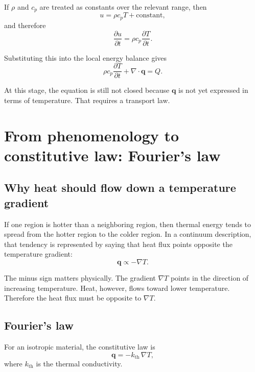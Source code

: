 \documentclass[11pt]{article}
\newcommand{\qvec}{\mathbf{q}}
\newcommand{\kth}{k_{\mathrm{th}}}
\begin{document}
If $\rho$ and $c_p$ are treated as constants over the relevant range, then
\begin{equation}
u = \rho c_p T + \text{constant},
\end{equation}
and therefore
\begin{equation}
\frac{\partial u}{\partial t} = \rho c_p \frac{\partial T}{\partial t}.
\end{equation}

Substituting this into the local energy balance gives
\begin{equation}
\rho c_p \frac{\partial T}{\partial t} + \nabla \cdot \qvec = Q.
\end{equation}

At this stage, the equation is still not closed because $\qvec$ is not yet expressed in terms of temperature. That requires a transport law.

\section{From phenomenology to constitutive law: Fourier's law}

\subsection{Why heat should flow down a temperature gradient}

If one region is hotter than a neighboring region, then thermal energy tends to spread from the hotter region to the colder region. In a continuum description, that tendency is represented by saying that heat flux points opposite the temperature gradient:
\begin{equation}
\qvec \propto -\nabla T.
\end{equation}

The minus sign matters physically. The gradient $\nabla T$ points in the direction of increasing temperature. Heat, however, flows toward lower temperature. Therefore the heat flux must be opposite to $\nabla T$.

\subsection{Fourier's law}

For an isotropic material, the constitutive law is
\begin{equation}
\qvec = -\kth \, \nabla T,
\end{equation}
where $\kth$ is the thermal conductivity.
\end{document}
